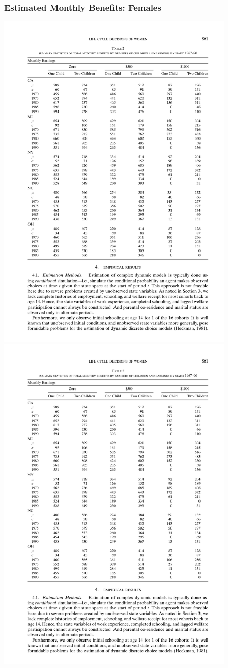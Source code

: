 \begin{frame}
	\frametitle{Estimated Monthly Benefits: Females}
	\includegraphics[width=4.5in]{tab-figs/table2b_2010-1} \\
	\includegraphics[width=4.5in]{tab-figs/table2a__2010.pdf} \\

\end{frame}
